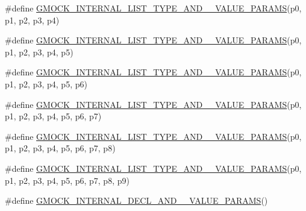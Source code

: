 \begin{DoxyCompactItemize}
\item 
\#define \mbox{\hyperlink{_obj__test_2lib_2googletest-master_2googlemock_2include_2gmock_2gmock-generated-actions_8h_a48e2764f7132a1840c2a4afe8d43556b}{G\+M\+O\+C\+K\+\_\+\+I\+N\+T\+E\+R\+N\+A\+L\+\_\+\+L\+I\+S\+T\+\_\+\+T\+Y\+P\+E\+\_\+\+A\+N\+D\+\_\+\_\+\+V\+A\+L\+U\+E\+\_\+\+P\+A\+R\+A\+MS}}(p0,  p1,  p2,  p3,  p4)
\item 
\#define \mbox{\hyperlink{_obj__test_2lib_2googletest-master_2googlemock_2include_2gmock_2gmock-generated-actions_8h_ab2f48b9bf3f455e081eac982aee31740}{G\+M\+O\+C\+K\+\_\+\+I\+N\+T\+E\+R\+N\+A\+L\+\_\+\+L\+I\+S\+T\+\_\+\+T\+Y\+P\+E\+\_\+\+A\+N\+D\+\_\+\_\+\+V\+A\+L\+U\+E\+\_\+\+P\+A\+R\+A\+MS}}(p0,  p1,  p2,  p3,  p4,  p5)
\item 
\#define \mbox{\hyperlink{_obj__test_2lib_2googletest-master_2googlemock_2include_2gmock_2gmock-generated-actions_8h_aa090e804a45b4373d38e6a0aa35e5997}{G\+M\+O\+C\+K\+\_\+\+I\+N\+T\+E\+R\+N\+A\+L\+\_\+\+L\+I\+S\+T\+\_\+\+T\+Y\+P\+E\+\_\+\+A\+N\+D\+\_\+\_\+\+V\+A\+L\+U\+E\+\_\+\+P\+A\+R\+A\+MS}}(p0,  p1,  p2,  p3,  p4,  p5,  p6)
\item 
\#define \mbox{\hyperlink{_obj__test_2lib_2googletest-master_2googlemock_2include_2gmock_2gmock-generated-actions_8h_ac46093455522025b3461ed0dfd326836}{G\+M\+O\+C\+K\+\_\+\+I\+N\+T\+E\+R\+N\+A\+L\+\_\+\+L\+I\+S\+T\+\_\+\+T\+Y\+P\+E\+\_\+\+A\+N\+D\+\_\+\_\+\+V\+A\+L\+U\+E\+\_\+\+P\+A\+R\+A\+MS}}(p0,  p1,  p2,  p3,  p4,  p5,  p6,  p7)
\item 
\#define \mbox{\hyperlink{_obj__test_2lib_2googletest-master_2googlemock_2include_2gmock_2gmock-generated-actions_8h_a3f7dd2bdf5feb78d9cd6a538366fed46}{G\+M\+O\+C\+K\+\_\+\+I\+N\+T\+E\+R\+N\+A\+L\+\_\+\+L\+I\+S\+T\+\_\+\+T\+Y\+P\+E\+\_\+\+A\+N\+D\+\_\+\_\+\+V\+A\+L\+U\+E\+\_\+\+P\+A\+R\+A\+MS}}(p0,  p1,  p2,  p3,  p4,  p5,  p6,  p7,  p8)
\item 
\#define \mbox{\hyperlink{_obj__test_2lib_2googletest-master_2googlemock_2include_2gmock_2gmock-generated-actions_8h_a646b96a3f316fa629cf7faaf509de76e}{G\+M\+O\+C\+K\+\_\+\+I\+N\+T\+E\+R\+N\+A\+L\+\_\+\+L\+I\+S\+T\+\_\+\+T\+Y\+P\+E\+\_\+\+A\+N\+D\+\_\+\_\+\+V\+A\+L\+U\+E\+\_\+\+P\+A\+R\+A\+MS}}(p0,  p1,  p2,  p3,  p4,  p5,  p6,  p7,  p8,  p9)
\item 
\#define \mbox{\hyperlink{_obj__test_2lib_2googletest-master_2googlemock_2include_2gmock_2gmock-generated-actions_8h_afbcc498768661d32cb658a8eb28535a9}{G\+M\+O\+C\+K\+\_\+\+I\+N\+T\+E\+R\+N\+A\+L\+\_\+\+D\+E\+C\+L\+\_\+\+A\+N\+D\+\_\+\_\+\+V\+A\+L\+U\+E\+\_\+\+P\+A\+R\+A\+MS}}()

\end{DoxyCompactItemize}
